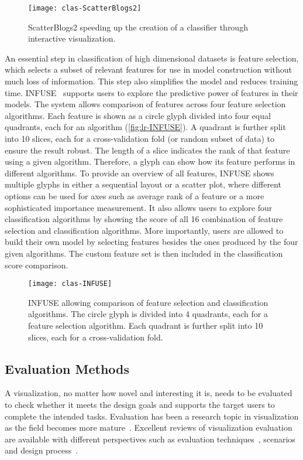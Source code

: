 \begin{figure}
	\centering
	\texttt{[image: clas-ScatterBlogs2]}
	\caption[ScatterBlogs2 -- interactive classifier]{ScatterBlogs2 speeding up the creation of a classifier through interactive visualization. }
	\label{fig:lr-ScatterBlogs2}
\end{figure}

An essential step in classification of high dimensional datasets is feature selection, which selects a subset of relevant features for use in model construction without much loss of information. This step also simplifies the model and reduces training time. INFUSE~\cite{Krause2014} supports users to explore the predictive power of features in their models. The system allows comparison of features across four feature selection algorithms. Each feature is shown as a circle glyph divided into four equal quadrants, each for an algorithm (\autoref{fig:lr-INFUSE}). A quadrant is further split into 10 slices, each for a cross-validation fold (or random subset of data) to ensure the result  robust. The length of a slice indicates the rank of that feature using a given algorithm. Therefore, a glyph can show how its feature performs in different algorithms. To provide an overview of all features, INFUSE shows multiple glyphs in either a sequential layout or a scatter plot, where different options can be used for axes such as average rank of a feature or a more sophisticated importance measurement. It also allows users to explore four classification algorithms by showing the score of all 16 combination of feature selection and classification algorithms. More importantly, users are allowed to build their own model by selecting features besides the ones produced by the four given algorithms. The custom feature set is then included in the classification score comparison.

\begin{figure}
	\centering
	\texttt{[image: clas-INFUSE]}
	\caption[INFUSE -- comparison of features in classification]{INFUSE allowing comparison of feature selection and classification algorithms. The circle glyph is divided into 4 quadrants, each for a feature selection algorithm. Each quadrant is further split into 10 slices, each for a cross-validation fold. }
	\label{fig:lr-INFUSE}
\end{figure}

\subsection{Evaluation Methods}
\label{sub:lr-evaluation}
A visualization, no matter how novel and interesting it is, needs to be evaluated to check whether it meets the design goals and supports the target users to complete the intended tasks. Evaluation has been a research topic in visualization as the field becomes more mature~\cite{Plaisant2004}. Excellent reviews of visualization evaluation are available with different perspectives such as evaluation techniques~\cite{Carpendale2008}, scenarios~\cite{Lam2012} and design process~\cite{Munroe2009}.

